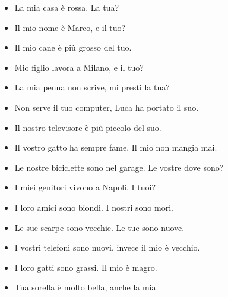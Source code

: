 \documentclass[letter,11pt]{article}
\begin{document}
\vskip 0.5in
\begin{multicols}{2}
\begin{itemize}
    \item La mia casa è rossa. La tua?
    \item Il mio nome è Marco, e il tuo?
    \item Il mio cane è più grosso del tuo.
    \item Mio figlio lavora a Milano, e il tuo?
    \item La mia penna non scrive, mi presti la tua?
    \item Non serve il tuo computer, Luca ha portato il suo.
    \item Il nostro televisore è più piccolo del suo.
    \item Il vostro gatto ha sempre fame. Il mio non mangia mai.
    \item Le nostre biciclette sono nel garage. Le vostre dove sono?
    \item I miei genitori vivono a Napoli. I tuoi?
    \item I loro amici sono biondi. I nostri sono mori.
    \item Le sue scarpe sono vecchie. Le tue sono nuove.
    \item I vostri telefoni sono nuovi, invece il mio è vecchio.
    \item I loro gatti sono grassi. Il mio è magro.
    \item Tua sorella è molto bella, anche la mia.


\end{itemize}
\end{multicols}
\end{document}
